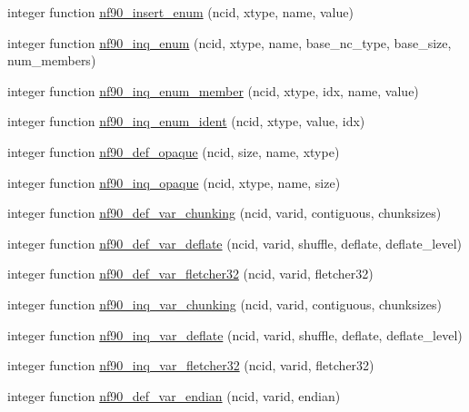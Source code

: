 \begin{DoxyCompactItemize}
\item 
integer function \hyperlink{netcdf4__func_8f90_ac0d635cd1bdcf36b30d7d6f4a2ef10ca}{nf90\+\_\+insert\+\_\+enum} (ncid, xtype, name, value)
\item 
integer function \hyperlink{netcdf4__func_8f90_a9094e88c1530acf69c39772d1b6665c8}{nf90\+\_\+inq\+\_\+enum} (ncid, xtype, name, base\+\_\+nc\+\_\+type, base\+\_\+size, num\+\_\+members)
\item 
integer function \hyperlink{netcdf4__func_8f90_a55293eaa82b440af0ad8cffaf434db6f}{nf90\+\_\+inq\+\_\+enum\+\_\+member} (ncid, xtype, idx, name, value)
\item 
integer function \hyperlink{netcdf4__func_8f90_aaad2b2da3ef4041a31bf300453bddeb0}{nf90\+\_\+inq\+\_\+enum\+\_\+ident} (ncid, xtype, value, idx)
\item 
integer function \hyperlink{netcdf4__func_8f90_a227ebda215dc96ed0af9912c7ad47b7a}{nf90\+\_\+def\+\_\+opaque} (ncid, size, name, xtype)
\item 
integer function \hyperlink{netcdf4__func_8f90_a94678c55c97098176c2b249d4d878f8e}{nf90\+\_\+inq\+\_\+opaque} (ncid, xtype, name, size)
\item 
integer function \hyperlink{netcdf4__func_8f90_a80e250c30ed7621fedec01bc2eb00a59}{nf90\+\_\+def\+\_\+var\+\_\+chunking} (ncid, varid, contiguous, chunksizes)
\item 
integer function \hyperlink{netcdf4__func_8f90_a1385c805e7cd4afb12ce626f6cea1a22}{nf90\+\_\+def\+\_\+var\+\_\+deflate} (ncid, varid, shuffle, deflate, deflate\+\_\+level)
\item 
integer function \hyperlink{netcdf4__func_8f90_ae826d57b99e9d780892e68949cb83b87}{nf90\+\_\+def\+\_\+var\+\_\+fletcher32} (ncid, varid, fletcher32)
\item 
integer function \hyperlink{netcdf4__func_8f90_a83b3deacd43f6cf63e4d0dd0a566bbdf}{nf90\+\_\+inq\+\_\+var\+\_\+chunking} (ncid, varid, contiguous, chunksizes)
\item 
integer function \hyperlink{netcdf4__func_8f90_ad075e2c7b73fecd709833342ccf4d695}{nf90\+\_\+inq\+\_\+var\+\_\+deflate} (ncid, varid, shuffle, deflate, deflate\+\_\+level)
\item 
integer function \hyperlink{netcdf4__func_8f90_af9fb9c8ab742f8b8e5153b7c8729c364}{nf90\+\_\+inq\+\_\+var\+\_\+fletcher32} (ncid, varid, fletcher32)
\item 
integer function \hyperlink{netcdf4__func_8f90_adb284c018687dc0eafb13f4ffc1caba9}{nf90\+\_\+def\+\_\+var\+\_\+endian} (ncid, varid, endian)
\item 

\end{DoxyCompactItemize}
